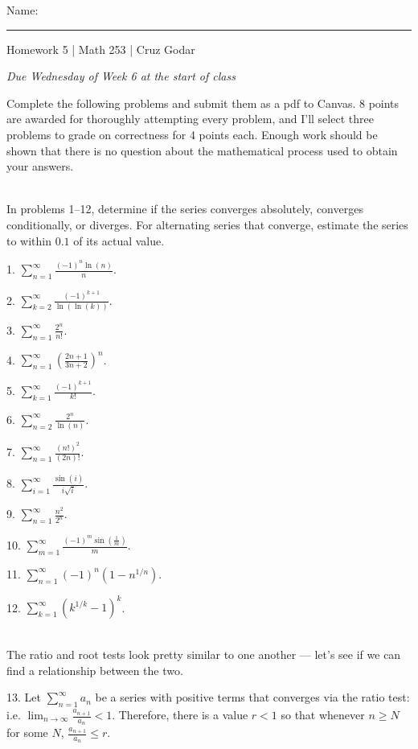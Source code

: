 \documentclass{article}
\begin{document}
\Large Name: \rule{2in}{0.15mm} \hfill Homework 5 | Math 253 | Cruz Godar \vspace{4pt} \normalsize

\textit{Due Wednesday of Week 6 at the start of class}

Complete the following problems and submit them as a pdf to Canvas. 8 points are awarded for thoroughly attempting every problem, and I'll select three problems to grade on correctness for 4 points each. Enough work should be shown that there is no question about the mathematical process used to obtain your answers.

~\\

In problems 1--12, determine if the series converges absolutely, converges conditionally, or diverges. For alternating series that converge, estimate the series to within $0.1$ of its actual value.

1. $\displaystyle \sum_{n = 1}^\infty \frac{(-1)^n\ln(n)}{n}$.

2. $\displaystyle \sum_{k = 2}^\infty \frac{(-1)^{k + 1}}{\ln(\ln(k))}$.

3. $\displaystyle \sum_{n = 1}^\infty \frac{2^n}{n!}$.

4. $\displaystyle \sum_{n = 1}^\infty \left( \frac{2n + 1}{3n + 2} \right)^n$.

5. $\displaystyle \sum_{k = 1}^\infty \frac{(-1)^{k + 1}}{k!}$.

6. $\displaystyle \sum_{n = 2}^\infty \frac{2^n}{\ln(n)}$.

7. $\displaystyle \sum_{n = 1}^\infty \frac{(n!)^2}{(2n)!}$.

8. $\displaystyle \sum_{i = 1}^\infty \frac{\sin(i)}{i\sqrt{i}}$.

9. $\displaystyle \sum_{n = 1}^\infty \frac{n^2}{2^n}$.

10. $\displaystyle \sum_{m = 1}^\infty \frac{(-1)^m \sin\left( \frac{1}{m} \right)}{m}$.

11. $\displaystyle \sum_{n = 1}^\infty (-1)^n \left( 1 - n^{1/n} \right)$.

12. $\displaystyle \sum_{k = 1}^\infty \left( k^{1/k} - 1 \right)^k$.

~\\

The ratio and root tests look pretty similar to one another --- let's see if we can find a relationship between the two.

13. Let $\displaystyle \sum_{n = 1}^\infty a_n$ be a series with positive terms that converges via the ratio test: i.e. $\displaystyle \lim_{n \to \infty} \frac{a_{n + 1}}{a_n} < 1$. Therefore, there is a value $r < 1$ so that whenever $n \geq N$ for some $N$, $\frac{a_{n + 1}}{a_n} \leq r$.
\end{document}
